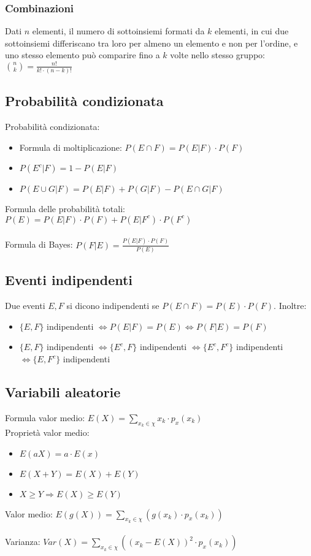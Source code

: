 \documentclass[10pt,a4paper]{article}
\begin{document}
\begin{multicols}{2}
\subsubsection*{Combinazioni}
Dati $n$ elementi, il numero di sottoinsiemi formati da $k$ elementi, in cui due sottoinsiemi differiscano tra loro per almeno un elemento e non per l'ordine, e uno stesso elemento può comparire fino a $k$ volte nello stesso gruppo: $\binom{n}{k} = \frac{n!}{k!\cdot (n-k)!}$
\subsection*{Probabilità condizionata}
Probabilità condizionata: 
\begin{itemize}
	\item Formula di moltiplicazione: $P(E \cap F) = P(E|F) \cdot P(F)$
	\item $P(E^c|F) = 1-P(E|F)$
	\item $P(E\cup G | F) = P(E|F) + P(G|F) - P(E \cap G |F)$
\end{itemize}
Formula delle probabilità totali: $P(E)=P(E|F) \cdot P(F) + P(E|F^c) \cdot P(F^c)$\\\\
Formula di Bayes: $P(F|E) = \frac{P(E|F) \cdot P(F)}{P(E)}$ 
\subsection*{Eventi indipendenti}
Due eventi $E,F$ si dicono indipendenti se $P(E \cap F) = P(E) \cdot P(F)$. Inoltre:
\begin{itemize}
	\item $\{E,F\}$ indipendenti $\iff P(E|F)=P(E) \iff P(F|E)=P(F)$
	\item $\{E,F\}$ indipendenti $\iff \{E^c,F\}$ indipendenti $\iff \{E^c,F^c\}$ indipendenti $\iff \{E,F^c\}$ indipendenti
\end{itemize}

\subsection*{Variabili aleatorie}
Formula valor medio: $E(X) = \sum\limits_{x_k \in \chi} x_k \cdot p_x(x_k)$\\
Proprietà valor medio:
\begin{itemize}
\item $E(aX) = a\cdot E(x)$
\item $E(X+Y) = E(X) + E(Y)$
\item $X \geq Y \Rightarrow E(X) \geq E(Y)$
\end{itemize}
Valor medio:
$E(g(X)) = \sum\limits_{x_k \in \chi} (g(x_k)\cdot p_x(x_k))$\\\\
Varianza: $Var(X) = \sum\limits_{x_k \in \chi}((x_k-E(X))^2\cdot p_x(x_k))$\\


\end{multicols}
\end{document}
